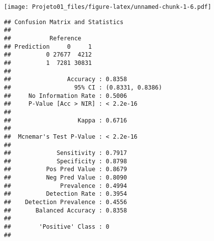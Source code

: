 \documentclass[]{article}
\newenvironment{Shaded}{\begin{snugshade}}{\end{snugshade}}
\newcommand{\CommentTok}[1]{\textcolor[rgb]{0.56,0.35,0.01}{\textit{#1}}}
\newcommand{\DataTypeTok}[1]{\textcolor[rgb]{0.13,0.29,0.53}{#1}}
\newcommand{\KeywordTok}[1]{\textcolor[rgb]{0.13,0.29,0.53}{\textbf{#1}}}
\newcommand{\NormalTok}[1]{#1}
\newcommand{\OperatorTok}[1]{\textcolor[rgb]{0.81,0.36,0.00}{\textbf{#1}}}
\newcommand{\StringTok}[1]{\textcolor[rgb]{0.31,0.60,0.02}{#1}}
\begin{document}
\texttt{[image: Projeto01\_files/figure-latex/unnamed-chunk-1-6.pdf]}

\begin{Shaded}
\end{Shaded}

\begin{verbatim}
## Confusion Matrix and Statistics
## 
##           Reference
## Prediction     0     1
##          0 27677  4212
##          1  7281 30831
##                                           
##                Accuracy : 0.8358          
##                  95% CI : (0.8331, 0.8386)
##     No Information Rate : 0.5006          
##     P-Value [Acc > NIR] : < 2.2e-16       
##                                           
##                   Kappa : 0.6716          
##                                           
##  Mcnemar's Test P-Value : < 2.2e-16       
##                                           
##             Sensitivity : 0.7917          
##             Specificity : 0.8798          
##          Pos Pred Value : 0.8679          
##          Neg Pred Value : 0.8090          
##              Prevalence : 0.4994          
##          Detection Rate : 0.3954          
##    Detection Prevalence : 0.4556          
##       Balanced Accuracy : 0.8358          
##                                           
##        'Positive' Class : 0               
## 
\end{verbatim}
\end{document}
